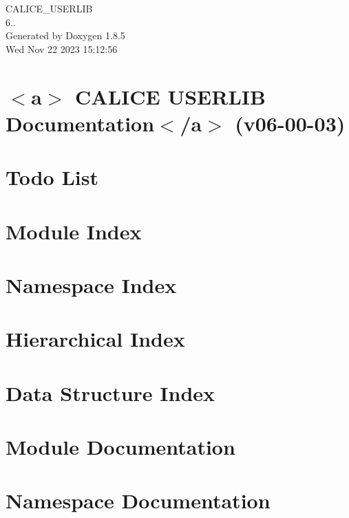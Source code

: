 \documentclass[twoside]{book}
\newcommand{\clearemptydoublepage}{%
  \newpage{\pagestyle{empty}\cleardoublepage}%
}
\begin{document}
\begin{titlepage}
\vspace*{7cm}
\begin{center}%
{\Large C\-A\-L\-I\-C\-E\-\_\-\-U\-S\-E\-R\-L\-I\-B \\[1ex]\large 6.. }\\
\vspace*{1cm}
{\large Generated by Doxygen 1.8.5}\\
\vspace*{0.5cm}
{\small Wed Nov 22 2023 15:12:56}\\
\end{center}
\end{titlepage}
\clearemptydoublepage
\tableofcontents
\clearemptydoublepage
{}

\chapter{$<$a$>$ C\-A\-L\-I\-C\-E U\-S\-E\-R\-L\-I\-B Documentation$<$/a$>$ (v06-\/00-\/03)}
\label{index}
\chapter{Todo List}
\label{todo}

\chapter{Module Index}

\chapter{Namespace Index}

\chapter{Hierarchical Index}

\chapter{Data Structure Index}

\chapter{Module Documentation}





\chapter{Namespace Documentation}


\end{document}
